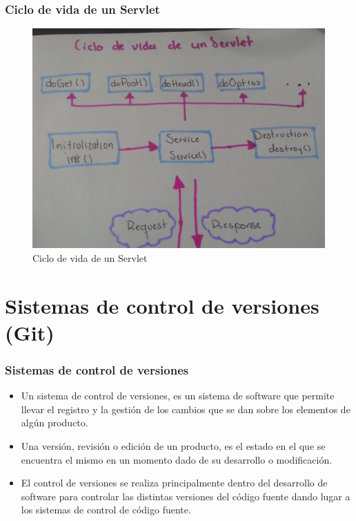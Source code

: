 \documentclass{beamer}
\begin{document}
\begin{frame}[fragile]
  \frametitle{Ciclo de vida de un Servlet}
  \begin{figure}[ht]
    \centering
    \includegraphics[scale=0.05]{figures/image03.jpg}
    \caption{\label{fig:img03} Ciclo de vida de un Servlet}
  \end{figure}
\end{frame}

\section{Sistemas de control de versiones (Git)}

\begin{frame}
  \frametitle{Sistemas de control de versiones}
  \begin{itemize}[<+->]
  \item Un sistema de control de versiones, es un sistema de software
    que permite llevar el registro y la gestión de los cambios que se dan
    sobre los elementos de algún producto.
  \item Una versión, revisión o edición de un producto, es el estado
    en el que se encuentra el mismo en un momento dado de su desarrollo o
    modificación.
  \item El control de versiones se realiza principalmente dentro del
    desarrollo de software para controlar las distintas versiones del
    código fuente dando lugar a los sistemas de control de código fuente.
  \end{itemize}
\end{frame}
\end{document}
